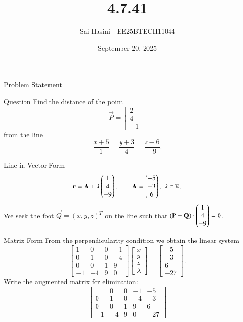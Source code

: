 \documentclass{beamer}
\title %
{4.7.41}
\date{September 20, 2025}
\author %
{Sai Hasini  - EE25BTECH11044}
\begin{document}
\begin{frame}{Problem Statement}
\begin{block}{Question}
Find the distance of the point
\[
\vec{P} = \begin{bmatrix} 2 \\ 4 \\ -1 \end{bmatrix}
\]
from the line
\[
\frac{x+5}{1} = \frac{y+3}{4} = \frac{z-6}{-9}.
\]
\end{block}
\end{frame}


\begin{frame}{Line in Vector Form}
\begin{equation}\label{eq:vectorform}
\mathbf{r}=\mathbf{A}+\lambda\begin{pmatrix}1\\4\\-9\end{pmatrix},\qquad
\mathbf{A}=\begin{pmatrix}-5\\-3\\6\end{pmatrix},\ \lambda\in\mathbb{R}.
\end{equation}
We seek the foot \(\vec{Q}=(x,y,z)^T\) on the line such that
\((\mathbf{P}-\mathbf{Q})\cdot\begin{pmatrix}1\\4\\-9\end{pmatrix}=0\).
\end{frame}

\begin{frame}{Matrix Form}
From the perpendicularity condition we obtain the linear system
\begin{equation}\label{eq:matrix}
\left[\begin{array}{cccc}
1 & 0 & 0 & -1\\[4pt]
0 & 1 & 0 & -4\\[4pt]
0 & 0 & 1 & 9 \\[4pt]
-1&-4 & 9 & 0
\end{array}\right]
\begin{bmatrix}x\\y\\z\\\lambda\end{bmatrix}
=
\begin{bmatrix}-5\\-3\\6\\-27\end{bmatrix}.
\end{equation}
Write the augmented matrix for elimination:
\begin{equation}\label{eq:aug}
\left[\begin{array}{cccc|c}
1 & 0 & 0 & -1 & -5\\[4pt]
0 & 1 & 0 & -4 & -3\\[4pt]
0 & 0 & 1 & 9  & 6 \\[4pt]
-1&-4 & 9 & 0  & -27
\end{array}\right]
\end{equation}
\end{frame}
\end{document}
